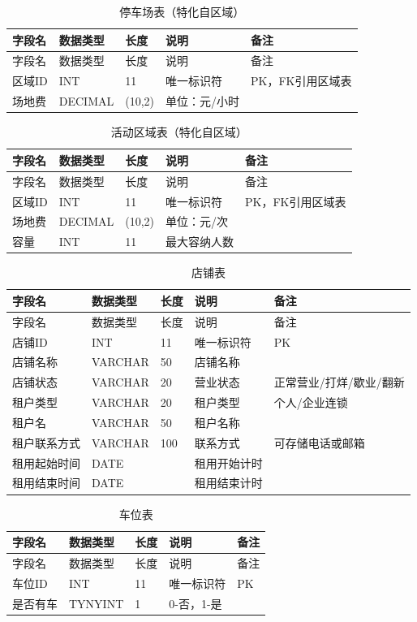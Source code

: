 \documentclass[]{article}
\begin{document}
\begin{longtable}[]{@{}lllll@{}}
\caption{停车场表（特化自区域）}\\
\toprule
字段名 & 数据类型 & 长度 & 说明 & 备注 \\
\midrule
\endfirsthead
\toprule
字段名 & 数据类型 & 长度 & 说明 & 备注 \\
\midrule
\endhead
区域ID & INT & 11 & 唯一标识符 & PK，FK引用区域表 \\
场地费 & DECIMAL & (10,2) & 单位：元/小时 & \\
\bottomrule
\end{longtable}

\begin{longtable}[]{@{}lllll@{}}
\caption{活动区域表（特化自区域）}\\
\toprule
字段名 & 数据类型 & 长度 & 说明 & 备注 \\
\midrule
\endfirsthead
\toprule
字段名 & 数据类型 & 长度 & 说明 & 备注 \\
\midrule
\endhead
区域ID & INT & 11 & 唯一标识符 & PK，FK引用区域表 \\
场地费 & DECIMAL & (10,2) & 单位：元/次 & \\
容量 & INT & 11 & 最大容纳人数 & \\
\bottomrule
\end{longtable}

\begin{longtable}[]{@{}lllll@{}}
\caption{店铺表}\\
\toprule
字段名 & 数据类型 & 长度 & 说明 & 备注 \\
\midrule
\endfirsthead
\toprule
字段名 & 数据类型 & 长度 & 说明 & 备注 \\
\midrule
\endhead
店铺ID & INT & 11 & 唯一标识符 & PK \\
店铺名称 & VARCHAR & 50 & 店铺名称 & \\
店铺状态 & VARCHAR & 20 & 营业状态 & 正常营业/打烊/歇业/翻新 \\
租户类型 & VARCHAR & 20 & 租户类型 & 个人/企业连锁 \\
租户名 & VARCHAR & 50 & 租户名称 & \\
租户联系方式 & VARCHAR & 100 & 联系方式 & 可存储电话或邮箱 \\
租用起始时间 & DATE &  & 租用开始计时 & \\
租用结束时间 & DATE &  & 租用结束计时 & \\
\bottomrule
\end{longtable}

\begin{longtable}[]{@{}lllll@{}}
\caption{车位表}\\
\toprule
字段名 & 数据类型 & 长度 & 说明 & 备注 \\
\midrule
\endfirsthead
\toprule
字段名 & 数据类型 & 长度 & 说明 & 备注 \\
\midrule
\endhead
车位ID & INT & 11 & 唯一标识符 & PK \\
是否有车 & TYNYINT & 1 & 0-否，1-是 & \\
\bottomrule
\end{longtable}
\end{document}
